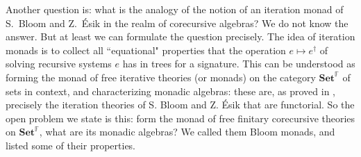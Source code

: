 \documentclass{LMCS}
\theoremstyle{plain}
\theoremstyle{definition}
\numberwithin{equation}{section}
\begin{document}
Another question is: what is the analogy of the notion of an iteration
monad of S.~Bloom and Z.~\'{E}sik \cite{be} in the realm of
corecursive algebras? We do not know the answer. But at least we can
formulate the question precisely. The idea of iteration monads is to
collect all ``equational" properties that the operation $e\mapsto
e^\dagger $ of solving recursive systems $e$ has in trees for a
signature. This can be understood as forming the monad of free
iterative theories (or monads) on the category
$\mathbf{Set}^\mathbb{F}$ of sets in context, and characterizing
monadic algebras: these are, as proved in \cite{amv_em2},
precisely the iteration theories of S. Bloom and Z. \'{E}sik that are
functorial. So the open problem we state is this: form the monad of
free finitary corecursive theories on $\mathbf{Set}^\mathbb{F}$,
what are its monadic algebras? We called them Bloom monads, and listed
some of their properties.



\vspace{-40 pt}
\end{document}
